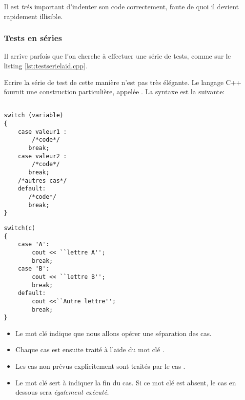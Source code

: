 \begin{habitudes}[Indentation]
Il est \emph{tr\`es} important d'indenter son code correctement, faute de quoi il devient rapidement illisible.
\end{habitudes}

\subsubsection{Tests en s\'eries}
Il arrive parfois que l'on cherche \`a effectuer une s\'erie de tests, comme sur le listing \ref{lst:testserielaid.cpp}.\\


Ecrire la s\'erie de test de cette mani\`ere n'est pas tr\`es \'el\'egante. Le langage C++ fournit une construction particuli\`ere, appel\'ee .
La syntaxe est la suivante:\\

\begin{DDbox}{\linewidth}
\begin{minipage}{0.45\linewidth}
    \begin{lstlisting}[caption=Syntaxe d'un switch]

switch (variable)
{
    case valeur1 :
    	/*code*/
	   break;
    case valeur2 :
    	/*code*/
	   break;
    /*autres cas*/
    default:
       /*code*/
       break;
}
    \end{lstlisting}
\end{minipage}
\qquad
\begin{minipage}{0.45\linewidth}
    \begin{lstlisting}[caption=Exemple de tests multiples]
switch(c)
{
	case 'A':
		cout << ``lettre A'';
		break;
	case 'B':
		cout << ``lettre B'';
		break;
	default:
		cout <<``Autre lettre'';
        break;
}

    \end{lstlisting}
\end{minipage}
\end{DDbox}

\begin{itemize}
		
	\item  Le mot cl\'e  indique que nous allons op\'erer une
		s\'eparation des cas.
		
	\item   Chaque cas est ensuite trait\'e \`a l'aide du mot cl\'e
		.

	\item Les cas non pr\'evus explicitement sont trait\'es par le cas
		.

	\item Le mot cl\'e  sert \`a indiquer la fin du cas. Si
		ce mot cl\'e est absent, le cas en dessous sera
		\emph{\'egalement ex\'ecut\'e}.
		
\end{itemize}



